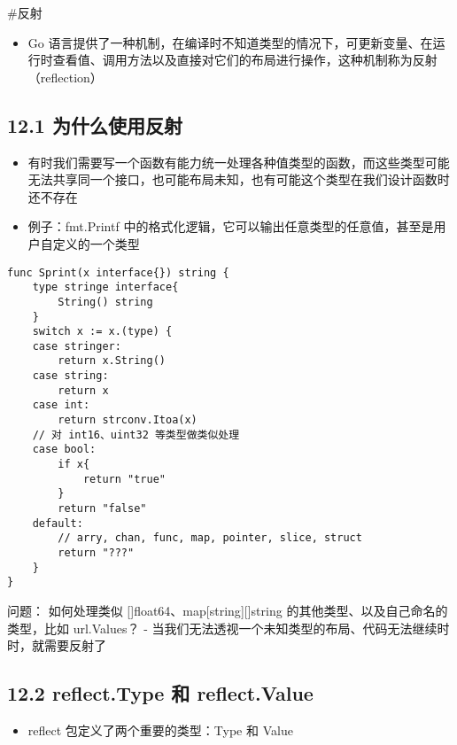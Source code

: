 \#反射

\begin{itemize}
\tightlist
\item
  Go
  语言提供了一种机制，在编译时不知道类型的情况下，可更新变量、在运行时查看值、调用方法以及直接对它们的布局进行操作，这种机制称为反射（reflection）
\end{itemize}

\hypertarget{ux4e3aux4ec0ux4e48ux4f7fux7528ux53cdux5c04}{%
\subsection{12.1
为什么使用反射}\label{ux4e3aux4ec0ux4e48ux4f7fux7528ux53cdux5c04}}

\begin{itemize}
\item
  有时我们需要写一个函数有能力统一处理各种值类型的函数，而这些类型可能无法共享同一个接口，也可能布局未知，也有可能这个类型在我们设计函数时还不存在
\item
  例子：fmt.Printf
  中的格式化逻辑，它可以输出任意类型的任意值，甚至是用户自定义的一个类型
\end{itemize}

\begin{verbatim}
func Sprint(x interface{}) string {
    type stringe interface{
        String() string
    }
    switch x := x.(type) {
    case stringer:
        return x.String()
    case string:
        return x
    case int:
        return strconv.Itoa(x)
    // 对 int16、uint32 等类型做类似处理
    case bool:
        if x{
            return "true"
        }
        return "false"
    default:
        // arry, chan, func, map, pointer, slice, struct
        return "???"
    }
}
\end{verbatim}

问题： 如何处理类似 {[}{]}float64、map{[}string{]}{[}{]}string
的其他类型、以及自己命名的类型，比如 url.Values？ -
当我们无法透视一个未知类型的布局、代码无法继续时时，就需要反射了

\hypertarget{reflect.type-ux548c-reflect.value}{%
\subsection{12.2 reflect.Type 和
reflect.Value}\label{reflect.type-ux548c-reflect.value}}

\begin{itemize}
\tightlist
\item
  reflect 包定义了两个重要的类型：Type 和 Value
\end{itemize}

